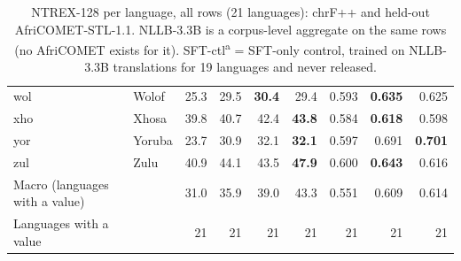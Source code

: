 \begin{table}[t]
\begin{tabular}{@{}llrrrrrrr@{}}
wol & Wolof & 25.3 & 29.5 & \textbf{30.4} & 29.4 & 0.593 & \textbf{0.635} & 0.625 \\
xho & Xhosa & 39.8 & 40.7 & 42.4 & \textbf{43.8} & 0.584 & \textbf{0.618} & 0.598 \\
yor & Yoruba & 23.7 & 30.9 & 32.1 & \textbf{32.1} & 0.597 & 0.691 & \textbf{0.701} \\
zul & Zulu & 40.9 & 44.1 & 43.5 & \textbf{47.9} & 0.600 & \textbf{0.643} & 0.616 \\
\midrule
Macro (languages with a value) &  & 31.0 & 35.9 & 39.0 & 43.3 & 0.551 & 0.609 & 0.614 \\
Languages with a value &  & 21 & 21 & 21 & 21 & 21 & 21 & 21 \\
\bottomrule
\end{tabular}
\caption{NTREX-128 per language, all rows (21 languages): chrF++ and held-out AfriCOMET-STL-1.1. NLLB-3.3B is a corpus-level aggregate on the same rows (no AfriCOMET exists for it). SFT-ctl\textsuperscript{a} = SFT-only control, trained on NLLB-3.3B translations for 19 languages and never released.}
\label{tab:fr-nt-merged}
\end{table}

